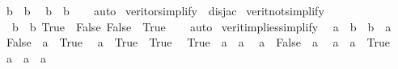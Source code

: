 \begin{isabellebody}
\ \ {\isacartoucheopen}b\ {\isasymor}\ {\isasymnot}b{\isacartoucheclose}\isanewline
\ \ {\isacartoucheopen}{\isasymnot}b\ {\isasymor}\ b{\isacartoucheclose}\isanewline
%
\isadelimproof
\ \ %
\endisadelimproof
%
\isatagproof
{}\isamarkupfalse%
\ auto%
\endisatagproof
{\isafoldproof}%
%
\isadelimproof
\isanewline
%
\endisadelimproof
\isanewline
{}\isamarkupfalse%
\ verit{\isacharunderscore}{\kern0pt}or{\isacharunderscore}{\kern0pt}simplify\ {\isacharequal}{\kern0pt}\ disj{\isacharunderscore}{\kern0pt}ac\isanewline
\isanewline
{}\isamarkupfalse%
\ verit{\isacharunderscore}{\kern0pt}not{\isacharunderscore}{\kern0pt}simplify{\isacharcolon}{\kern0pt}\isanewline
\ \ {\isacartoucheopen}{\isasymnot}\ {\isasymnot}b\ {\isasymlongleftrightarrow}\ b{\isacartoucheclose}\ {\isacartoucheopen}{\isasymnot}True\ {\isasymlongleftrightarrow}\ False{\isacartoucheclose}\ {\isacartoucheopen}{\isasymnot}False\ {\isasymlongleftrightarrow}\ True{\isacartoucheclose}\isanewline
%
\isadelimproof
\ \ %
\endisadelimproof
%
\isatagproof
{}\isamarkupfalse%
\ auto%
\endisatagproof
{\isafoldproof}%
%
\isadelimproof
\isanewline
%
\endisadelimproof
\isanewline
\isanewline
{}\isamarkupfalse%
\ verit{\isacharunderscore}{\kern0pt}implies{\isacharunderscore}{\kern0pt}simplify{\isacharcolon}{\kern0pt}\isanewline
\ \ {\isacartoucheopen}{\isacharparenleft}{\kern0pt}{\isasymnot}a\ {\isasymlongrightarrow}\ {\isasymnot}b{\isacharparenright}{\kern0pt}\ {\isasymlongleftrightarrow}\ {\isacharparenleft}{\kern0pt}b\ {\isasymlongrightarrow}\ a{\isacharparenright}{\kern0pt}{\isacartoucheclose}\isanewline
\ \ {\isacartoucheopen}{\isacharparenleft}{\kern0pt}False\ {\isasymlongrightarrow}\ a{\isacharparenright}{\kern0pt}\ {\isasymlongleftrightarrow}\ True{\isacartoucheclose}\isanewline
\ \ {\isacartoucheopen}{\isacharparenleft}{\kern0pt}a\ {\isasymlongrightarrow}\ True{\isacharparenright}{\kern0pt}\ {\isasymlongleftrightarrow}\ True{\isacartoucheclose}\isanewline
\ \ {\isacartoucheopen}{\isacharparenleft}{\kern0pt}True\ {\isasymlongrightarrow}\ a{\isacharparenright}{\kern0pt}\ {\isasymlongleftrightarrow}\ a{\isacartoucheclose}\isanewline
\ \ {\isacartoucheopen}{\isacharparenleft}{\kern0pt}a\ {\isasymlongrightarrow}\ False{\isacharparenright}{\kern0pt}\ {\isasymlongleftrightarrow}\ {\isasymnot}a{\isacartoucheclose}\isanewline
\ \ {\isacartoucheopen}{\isacharparenleft}{\kern0pt}a\ {\isasymlongrightarrow}\ a{\isacharparenright}{\kern0pt}\ {\isasymlongleftrightarrow}\ True{\isacartoucheclose}\isanewline
\ \ {\isacartoucheopen}{\isacharparenleft}{\kern0pt}{\isasymnot}a\ {\isasymlongrightarrow}\ a{\isacharparenright}{\kern0pt}\ {\isasymlongleftrightarrow}\ a{\isacartoucheclose}\isanewline

\end{isabellebody}

